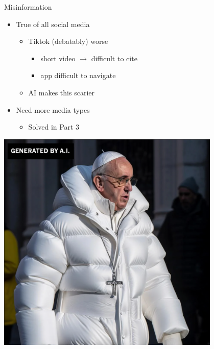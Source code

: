 \documentclass[aspectratio=35]{beamer} %
\begin{document}
\begin{frame}{Misinformation}
\vspace{-0.3in}
\begin{itemize}
    \item True of all social media
    \begin{itemize}
        \item Tiktok (debatably) worse
        \begin{itemize}
            \item short video $\rightarrow$ difficult to cite
            \item app difficult to navigate
        \end{itemize}
    \item AI makes this scarier
    \end{itemize}
    \item Need more media types
    \begin{itemize}
        \item Solved in Part 3
    \end{itemize}
\end{itemize}
\center
\includegraphics[width=0.8\textwidth]{imgs/why_replace/pope.png}
\end{frame}
\end{document}
